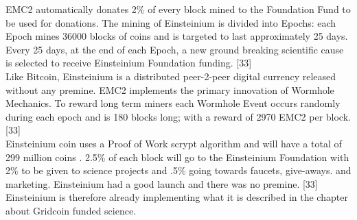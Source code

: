 
EMC2 automatically donates 2\% of every block mined to the Foundation Fund to be used for donations. The mining of Einsteinium is divided into Epochs: each Epoch mines 36000 blocks of coins and is targeted to last approximately 25 days. Every 25 days, at the end of each Epoch, a new ground breaking scientific cause is selected to receive Einsteinium Foundation funding. [33]\\

Like Bitcoin, Einsteinium is a distributed peer-2-peer digital currency released without any premine. EMC2 implements the primary innovation of Wormhole Mechanics. To reward long term miners each Wormhole Event occurs randomly during each epoch and is 180 blocks long; with a reward of 2970 EMC2 per block. [33]\\


Einsteinium coin uses a Proof of Work scrypt algorithm and will have a total of 299 million coins . 2.5\% of each block will go to the Einsteinium Foundation with 2\% to be given to science projects and .5\% going towards faucets, give-aways. and marketing. Einsteinium had a good launch and there was no premine. [33]\\
 
Einsteinium is therefore already implementing what it is described in the chapter about Gridcoin funded science.
